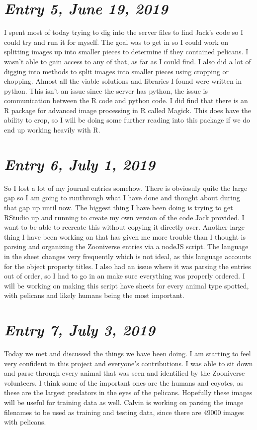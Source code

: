 \documentclass{article}
\begin{document}
\section{\Large \itshape Entry 5, June 19, 2019}
	I spent most of today trying to dig into the server files to find Jack's code so I could try and run it for myself.
The goal was to get in so I could work on splitting images up into smaller pieces to determine if they contained pelicans. I wasn't able to gain access to any of that, as far as I could find.
I also did a lot of digging into methods to split images into smaller pieces using cropping or chopping. Almost all the viable solutions and libraries I found were written in python. This isn't an issue since the server has python, the issue is communication between the R code and python code.
I did find that there is an R package for advanced image processing in R called Magick. This does have the ability to crop, so I will be doing some further reading into this package if we do end up working heavily with R.

\section{\Large \itshape Entry 6, July 1, 2019}
So I lost a lot of my journal entries somehow. There is obviosuly quite the large gap so I am going to runthrough what I have done and thought about during that gap up until now.
The biggest thing I have been doing is trying to get RStudio up and running to create my own version of the code Jack provided. I want to be able to recreate this without copying it directly over.
\newline
Another large thing I have been working on that has given me more trouble than I thought is parsing and organizing the Zooniverse entries via a nodeJS script. The language in the sheet changes very frequently which is not ideal, as this language accounts for the object property titles. I also had an issue where it was parsing the entries out of order, so I had to go in an make sure everything was properly ordered. I will be working on making this script have sheets for every animal type spotted, with pelicans and likely humans being the most important.


\section{\Large \itshape Entry 7, July 3, 2019}
Today we met and discussed the things we have been doing. I am starting to feel very confident in this project and everyone's contributions. I was able to sit down and parse through every animal that was seen and identified by the Zooniverse volunteers. I think some of the important ones are the humans and coyotes, as these are the largest predators in the eyes of the pelicans. Hopefully these images will be useful for training data as well. Calvin is working on parsing the image filenames to be used as training and testing data, since there are 49000 images with pelicans.
\end{document}
